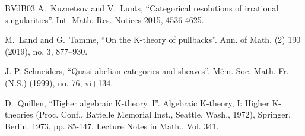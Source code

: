 \documentclass[11pt,leqno]{amsart}
\numberwithin{equation}{section}
\begin{document}
\begin{thebibliography}{BVdB03}
 A.~Kuznetsov and V.~Lunts, ``Categorical resolutions of irrational singularities''. Int. Math. Res. Notices 2015, 4536-4625.

 M.~Land and G.~Tamme, ``On the K-theory of pullbacks''. Ann. of Math. (2) 190 (2019), no. 3, 877–930. 

 J.-P. Schneiders, ``Quasi-abelian categories and sheaves''. M\'em. Soc. Math. Fr. (N.S.) (1999), no. 76,
vi+134.

 D.~Quillen, ``Higher algebraic K-theory. I''. Algebraic K-theory, I: Higher K-theories
(Proc. Conf., Battelle Memorial Inst., Seattle, Wash., 1972), Springer, Berlin, 1973,
pp. 85-147. Lecture Notes in Math., Vol. 341.


\end{thebibliography}
\end{document}
